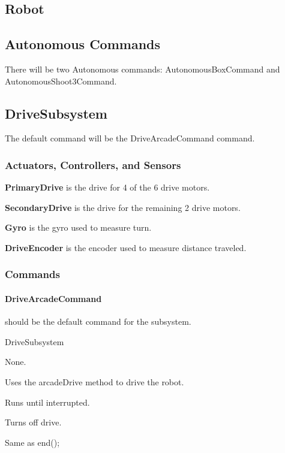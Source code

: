 \documentclass[]{article}
\begin{document}
\subsection{Robot}

\subsection{Autonomous Commands}

There will be two Autonomous commands: AutonomousBoxCommand and AutonomousShoot3Command.

\subsection{DriveSubsystem}

The default command will be the DriveArcadeCommand command.

\subsubsection{Actuators, Controllers, and Sensors}

\textbf{PrimaryDrive} is the drive for 4 of the 6 drive motors.

\textbf{SecondaryDrive} is the drive for the remaining 2 drive motors.

\textbf{Gyro} is the gyro used to measure turn.

\textbf{DriveEncoder} is the encoder used to measure distance traveled.

\subsubsection{Commands}

\paragraph{DriveArcadeCommand} should be the default command for the subsystem.
\begin{description}[topsep=0ex]
\item[requires] DriveSubsystem
\item[initialization]  None.
\item[execute] Uses the arcadeDrive method to drive the robot.
\item[isDone] Runs until interrupted.
\item[end] Turns off drive.
\item[interrupted] Same as end();
\end{description}
\end{document}
